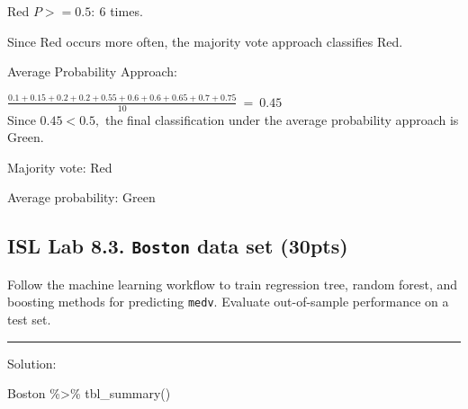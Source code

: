 \documentclass[
]{article}
\newenvironment{Shaded}{\begin{snugshade}}{\end{snugshade}}
\newcommand{\FunctionTok}[1]{\textcolor[rgb]{0.28,0.35,0.67}{#1}}
\newcommand{\NormalTok}[1]{\textcolor[rgb]{0.00,0.23,0.31}{#1}}
\newcommand{\SpecialCharTok}[1]{\textcolor[rgb]{0.37,0.37,0.37}{#1}}
\begin{document}
Red \(P>= 0.5 :\ 6\) times.

Since Red occurs more often, the majority vote approach classifies Red.

Average Probability Approach:

\(\frac{0.1 + 0.15 + 0.2 + 0.2 + 0.55 + 0.6 + 0.6 + 0.65 + 0.7 + 0.75}{10}\ =\ 0.45\)\\
Since \(0.45 < 0.5,\) the final classification under the average
probability approach is Green.

Majority vote: Red

Average probability: Green

\hypertarget{isl-lab-8.3.-boston-data-set-30pts}{%
\subsection{\texorpdfstring{ISL Lab 8.3. \texttt{Boston} data set
(30pts)}{ISL Lab 8.3. Boston data set (30pts)}}\label{isl-lab-8.3.-boston-data-set-30pts}}

Follow the machine learning workflow to train regression tree, random
forest, and boosting methods for predicting \texttt{medv}. Evaluate
out-of-sample performance on a test set.

\begin{center}\rule{0.5\linewidth}{0.5pt}\end{center}

Solution:

\begin{Shaded}
\begin{Highlighting}[]
\NormalTok{Boston }\SpecialCharTok{\%\textgreater{}\%} \FunctionTok{tbl\_summary}\NormalTok{()}
\end{Highlighting}
\end{Shaded}
\end{document}
